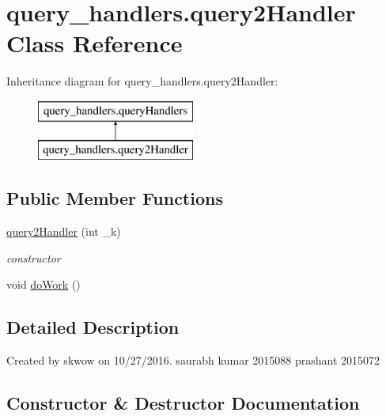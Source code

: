 \hypertarget{classquery__handlers_1_1query2_handler}{}\section{query\+\_\+handlers.\+query2\+Handler Class Reference}
\label{classquery__handlers_1_1query2_handler}
Inheritance diagram for query\+\_\+handlers.\+query2\+Handler\+:\begin{figure}[H]
\begin{center}
\leavevmode
\includegraphics[height=2.000000cm]{classquery__handlers_1_1query2_handler}
\end{center}
\end{figure}
\subsection*{Public Member Functions}
\begin{DoxyCompactItemize}
\item 
\hyperlink{classquery__handlers_1_1query2_handler_a76beaa307feebaddfb1c0bc45432b3b8}{query2\+Handler} (int \+\_\+k)
\begin{DoxyCompactList}\small\item\em constructor \end{DoxyCompactList}\item 
void \hyperlink{classquery__handlers_1_1query2_handler_aea6272ec7e1d5c8806f95120c64f2d8c}{do\+Work} ()
\end{DoxyCompactItemize}


\subsection{Detailed Description}
Created by skwow on 10/27/2016. saurabh kumar 2015088 prashant 2015072 

\subsection{Constructor \& Destructor Documentation}
\hypertarget{classquery__handlers_1_1query2_handler_a76beaa307feebaddfb1c0bc45432b3b8}{}\label{classquery__handlers_1_1query2_handler_a76beaa307feebaddfb1c0bc45432b3b8} 
